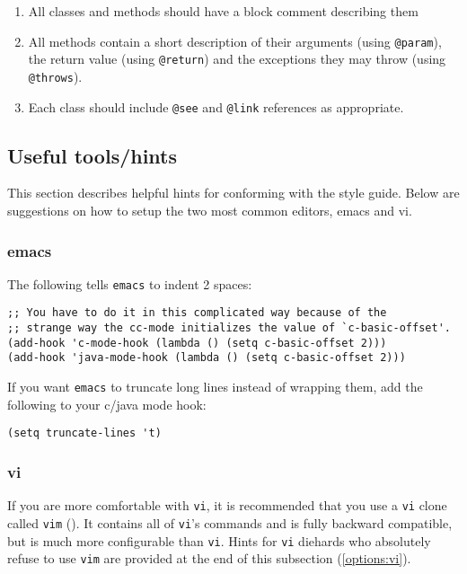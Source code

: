 \begin{enumerate}
\item All classes and methods should have a block comment describing
them
\item All methods contain a short description of their arguments
(using {\tt @param}), the return value (using {\tt @return}) and the
exceptions they may throw (using {\tt @throws}).
\item Each class should include {\tt @see} and {\tt @link} 
references as appropriate.
\end{enumerate}

\subsection {Useful tools/hints}

This section describes helpful hints for conforming with the style
guide.  Below are suggestions on how to setup the two most common
editors, emacs and vi. 

\subsubsection{emacs} 

The following tells {\tt emacs} to indent 2 spaces:
\begin{verbatim}
;; You have to do it in this complicated way because of the
;; strange way the cc-mode initializes the value of `c-basic-offset'.
(add-hook 'c-mode-hook (lambda () (setq c-basic-offset 2)))
(add-hook 'java-mode-hook (lambda () (setq c-basic-offset 2)))
\end{verbatim}
If you want {\tt emacs} to truncate long lines instead of wrapping them, add
the following to your c/java mode hook:
\begin{verbatim}
(setq truncate-lines 't)
\end{verbatim}

\subsubsection{vi}\label{options:vi/vim}

If you are more comfortable with {\tt vi}, it is recommended that you
use a {\tt vi} clone called {\tt vim} 
(\xlink{{\tt \VimURL}}{\VimURL}).  It
contains all of {\tt vi}'s commands and is fully backward compatible,
but is much more configurable than {\tt vi}.  Hints for {\tt vi}
diehards who absolutely refuse to use {\tt vim} are provided at the end
of this subsection (\ref{options:vi}).

